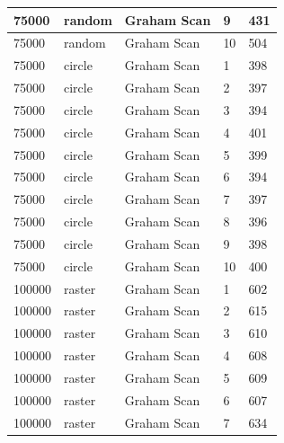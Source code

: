 \documentclass[12pt]{article}
\begin{document}
\begin{longtable}{|l|l|l|l|l|}
75000        & random            & Graham Scan & 9          & 431                           \\ \hline
75000        & random            & Graham Scan & 10         & 504                           \\ \hline
75000        & circle            & Graham Scan & 1          & 398                           \\ \hline
75000        & circle            & Graham Scan & 2          & 397                           \\ \hline
75000        & circle            & Graham Scan & 3          & 394                           \\ \hline
75000        & circle            & Graham Scan & 4          & 401                           \\ \hline
75000        & circle            & Graham Scan & 5          & 399                           \\ \hline
75000        & circle            & Graham Scan & 6          & 394                           \\ \hline
75000        & circle            & Graham Scan & 7          & 397                           \\ \hline
75000        & circle            & Graham Scan & 8          & 396                           \\ \hline
75000        & circle            & Graham Scan & 9          & 398                           \\ \hline
75000        & circle            & Graham Scan & 10         & 400                           \\ \hline
100000       & raster            & Graham Scan & 1          & 602                           \\ \hline
100000       & raster            & Graham Scan & 2          & 615                           \\ \hline
100000       & raster            & Graham Scan & 3          & 610                           \\ \hline
100000       & raster            & Graham Scan & 4          & 608                           \\ \hline
100000       & raster            & Graham Scan & 5          & 609                           \\ \hline
100000       & raster            & Graham Scan & 6          & 607                           \\ \hline
100000       & raster            & Graham Scan & 7          & 634                           \\ \hline

\end{longtable}
\end{document}

